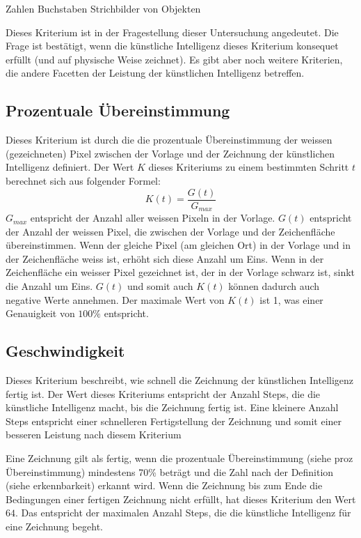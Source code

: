 Zahlen  
Buchstaben
Strichbilder von Objekten

Dieses Kriterium ist in der Fragestellung dieser Untersuchung angedeutet. Die
Frage ist bestätigt, wenn die künstliche Intelligenz dieses Kriterium konsequet
erfüllt (und auf physische Weise zeichnet). Es gibt aber noch weitere Kriterien,
die andere Facetten der Leistung der künstlichen Intelligenz betreffen.

\subsection{Prozentuale Übereinstimmung}
Dieses Kriterium ist durch die die prozentuale Übereinstimmung der weissen
(gezeichneten) Pixel zwischen der Vorlage und der Zeichnung der künstlichen
Intelligenz definiert. Der Wert $K$ dieses Kriteriums zu einem bestimmten
Schritt $t$ berechnet sich aus folgender Formel:
\begin{equation}
  \label{eq:m_reward}
  K(t) = \frac{G(t)}{G_{max}}
\end{equation}
$G_{max}$ entspricht der Anzahl aller weissen Pixeln in der Vorlage. $G(t)$
entspricht der Anzahl der weissen Pixel, die zwischen der Vorlage und der
Zeichenfläche übereinstimmen. Wenn der gleiche Pixel (am gleichen Ort) in der
Vorlage und in der Zeichenfläche weiss ist, erhöht sich diese Anzahl um Eins.
Wenn in der Zeichenfläche ein weisser Pixel gezeichnet ist, der in der Vorlage
schwarz ist, sinkt die Anzahl um Eins. $G(t)$ und somit auch $K(t)$ können
dadurch auch negative Werte annehmen. Der maximale Wert von $K(t)$ ist 1, was
einer Genauigkeit von $100\%$ entspricht.

\subsection{Geschwindigkeit}
Dieses Kriterium beschreibt, wie schnell die Zeichnung der künstlichen
Intelligenz fertig ist. Der Wert dieses Kriteriums entspricht der Anzahl Steps,
die die künstliche Intelligenz macht, bis die Zeichnung fertig ist. Eine
kleinere Anzahl Steps entspricht einer schnelleren Fertigstellung der Zeichnung
und somit einer besseren Leistung nach diesem Kriterium

Eine Zeichnung gilt als fertig, wenn die prozentuale Übereinstimmung (siehe proz
Übereinstimmung) mindestens 70\% beträgt und die Zahl nach der Definition (siehe
erkennbarkeit) erkannt wird. Wenn die Zeichnung bis zum Ende die Bedingungen
einer fertigen Zeichnung nicht erfüllt, hat dieses Kriterium den Wert $64$. Das
entspricht der maximalen Anzahl Steps, die die künstliche Intelligenz für eine
Zeichnung begeht.























